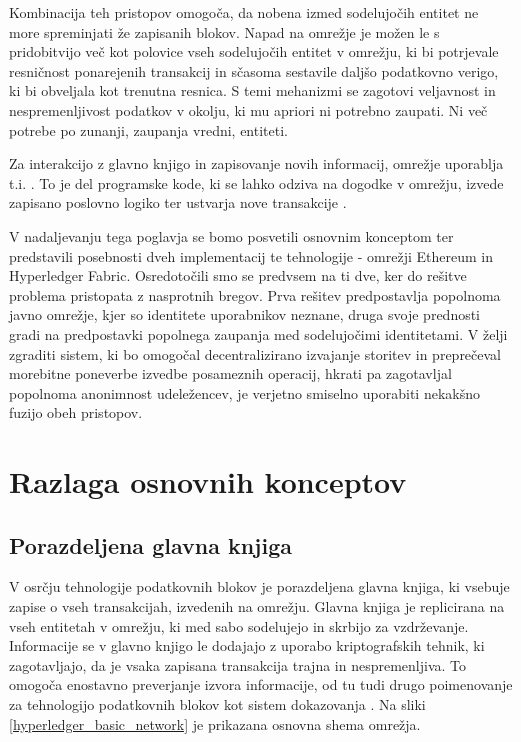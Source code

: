 \documentclass[a4paper, 12pt]{book}
\begin{document}
Kombinacija teh pristopov omogoča, da nobena izmed sodelujočih entitet ne more spreminjati že zapisanih blokov.
Napad na omrežje je možen le s pridobitvijo več kot polovice vseh sodelujočih entitet v omrežju, ki bi potrjevale resničnost ponarejenih transakcij in sčasoma sestavile daljšo podatkovno verigo, ki bi obveljala kot trenutna resnica.
S temi mehanizmi se zagotovi veljavnost in nespremenljivost podatkov v okolju, ki mu apriori ni potrebno zaupati.
Ni več potrebe po zunanji, zaupanja vredni, entiteti.

Za interakcijo z glavno knjigo in zapisovanje novih informacij, omrežje uporablja t.i. .
To je del programske kode, ki se lahko odziva na dogodke v omrežju, izvede zapisano poslovno logiko ter ustvarja nove transakcije \cite{hyperledgerDocs}.

V nadaljevanju tega poglavja se bomo posvetili osnovnim konceptom ter predstavili posebnosti dveh implementacij te tehnologije - omrežji Ethereum in Hyperledger Fabric.
Osredotočili smo se predvsem na ti dve, ker do rešitve problema pristopata z nasprotnih bregov.
Prva rešitev predpostavlja popolnoma javno omrežje, kjer so identitete uporabnikov neznane, druga svoje prednosti gradi na predpostavki popolnega zaupanja med sodelujočimi identitetami.
V želji zgraditi sistem, ki bo omogočal decentralizirano izvajanje storitev in preprečeval morebitne poneverbe izvedbe posameznih operacij, hkrati pa zagotavljal popolnoma anonimnost udeležencev, je verjetno smiselno uporabiti nekakšno fuzijo obeh pristopov.

\section{Razlaga osnovnih konceptov}

\subsection{Porazdeljena glavna knjiga}
V osrčju tehnologije podatkovnih blokov je porazdeljena glavna knjiga, ki vsebuje zapise o vseh transakcijah, izvedenih na omrežju.
Glavna knjiga je replicirana na vseh entitetah v omrežju, ki med sabo sodelujejo in skrbijo za vzdrževanje.
Informacije se v glavno knjigo le dodajajo z uporabo kriptografskih tehnik, ki zagotavljajo, da je vsaka zapisana transakcija trajna in nespremenljiva.
To omogoča enostavno preverjanje izvora informacije, od tu tudi drugo poimenovanje za tehnologijo podatkovnih blokov kot sistem dokazovanja \cite{hyperledgerDocs}.
Na sliki \ref{hyperledger_basic_network} je prikazana osnovna shema omrežja.
\end{document}
